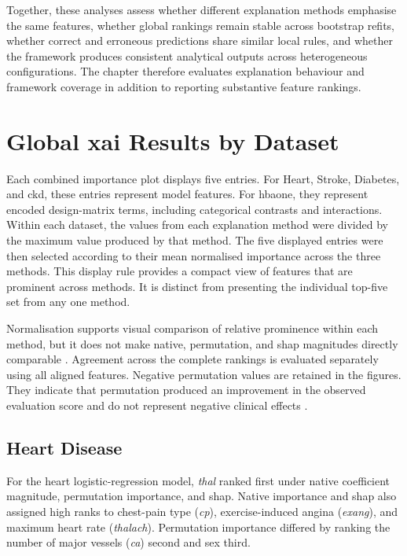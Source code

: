 Together, these analyses assess whether different explanation methods emphasise the same features, whether global rankings remain stable across bootstrap refits, whether correct and erroneous predictions share similar local rules, and whether the framework produces consistent analytical outputs across heterogeneous configurations. The chapter therefore evaluates explanation behaviour and framework coverage in addition to reporting substantive feature rankings.

\section{Global \gls{xai} Results by Dataset}

Each combined importance plot displays five entries. For Heart, Stroke, Diabetes, and \gls{ckd}, these entries represent model features. For \gls{hbaone}, they represent encoded design-matrix terms, including categorical contrasts and interactions. Within each dataset, the values from each explanation method were divided by the maximum value produced by that method. The five displayed entries were then selected according to their mean normalised importance across the three methods. This display rule provides a compact view of features that are prominent across methods. It is distinct from presenting the individual top-five set from any one method.

Normalisation supports visual comparison of relative prominence within each method, but it does not make native, permutation, and \gls{shap} magnitudes directly comparable \citep{fisher_models_2019, NIPS2017_8a20a862, linardatos_explainable_2020}. Agreement across the complete rankings is evaluated separately using all aligned features. Negative permutation values are retained in the figures. They indicate that permutation produced an improvement in the observed evaluation score and do not represent negative clinical effects \citep{fisher_models_2019}.

\subsection{Heart Disease}

For the heart logistic-regression model, \emph{thal} ranked first under native coefficient magnitude, permutation importance, and \gls{shap}. Native importance and \gls{shap} also assigned high ranks to chest-pain type (\emph{cp}), exercise-induced angina (\emph{exang}), and maximum heart rate (\emph{thalach}). Permutation importance differed by ranking the number of major vessels (\emph{ca}) second and sex third.

